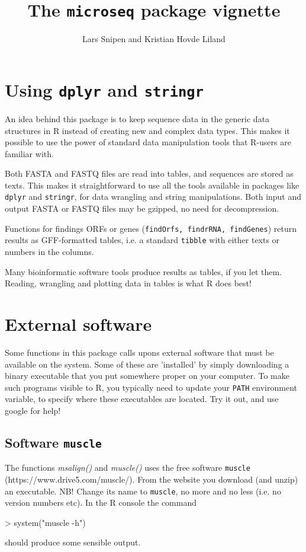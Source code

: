 \documentclass{article}
\title{The \texttt{microseq} package vignette}
\author{Lars Snipen and Kristian Hovde Liland}
\date{}
\begin{document}

\maketitle


\section{Using \texttt{dplyr} and \texttt{stringr}}
An idea behind this package is to keep sequence data in the generic data structures in R instead of creating new and complex data types. This makes it possible to use the power of standard data manipulation tools that R-users are familiar with.

Both FASTA and FASTQ files are read into tables, and sequences are stored as texts. This makes it straightforward to use all the tools available in packages like \texttt{dplyr} and \texttt{stringr}, for data wrangling and string manipulations. Both input and output FASTA or FASTQ files may be gzipped, no need for decompression.

Functions for findings ORFs or genes (\texttt{findOrfs, findrRNA, findGenes}) return results as GFF-formatted tables, i.e. a standard \texttt{tibble} with either texts or numbers in the columns.

Many bioinformatic software tools produce results as tables, if you let them. Reading, wrangling and plotting data in tables is what R does best!




\section{External software}
Some functions in this package calls upons external software that must be available on the system. Some of these are 'installed' by simply downloading a binary executable that you put somewhere proper on your computer. To make such programs visible to R, you typically need to update your \texttt{PATH} environment variable, to specify where these executables are located. Try it out, and use google for help!


\subsection{Software \texttt{muscle}}
The functions \emph{msalign()} and \emph{muscle()} uses the free software \texttt{muscle} (https://www.drive5.com/muscle/). From the website you download (and unzip) an executable. NB! Change its name to \texttt{muscle}, no more and no less (i.e. no version numbers etc). In the R console the command
\begin{Schunk}
\begin{Sinput}
> system("muscle -h")
\end{Sinput}
\end{Schunk}
should produce some sensible output.
\end{document}
